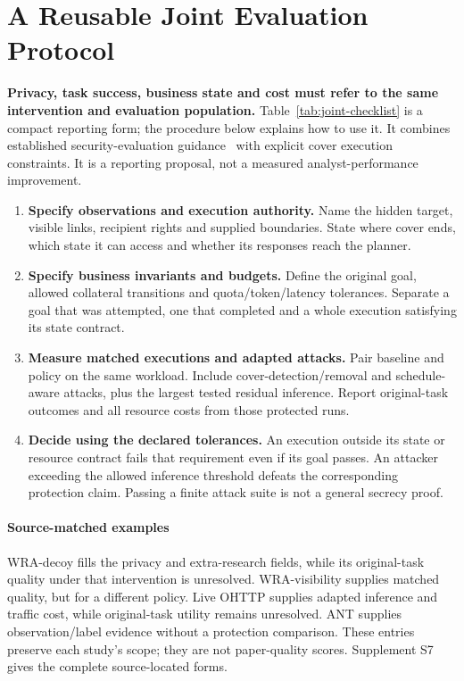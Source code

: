 \section{A Reusable Joint Evaluation Protocol}\label{sec:reporting}
\textbf{Privacy, task success, business state and cost must refer to the same intervention and evaluation population.}
Table~\ref{tab:joint-checklist} is a compact reporting form; the procedure below explains how to use it. It combines established security-evaluation guidance~\cite{arp2022dos,juarez2014critical,mathews2023critical,tramer2020adaptive} with explicit cover execution constraints. It is a reporting proposal, not a measured analyst-performance improvement.




\begin{enumerate}
\item \textbf{Specify observations and execution authority.} Name the hidden target, visible links, recipient rights and supplied boundaries. State where cover ends, which state it can access and whether its responses reach the planner.
\item \textbf{Specify business invariants and budgets.} Define the original goal, allowed collateral transitions and quota/token/latency tolerances. Separate a goal that was attempted, one that completed and a whole execution satisfying its state contract.
\item \textbf{Measure matched executions and adapted attacks.} Pair baseline and policy on the same workload. Include cover-detection/removal and schedule-aware attacks, plus the largest tested residual inference. Report original-task outcomes and all resource costs from those protected runs.
\item \textbf{Decide using the declared tolerances.} An execution outside its state or resource contract fails that requirement even if its goal passes. An attacker exceeding the allowed inference threshold defeats the corresponding protection claim. Passing a finite attack suite is not a general secrecy proof.
\end{enumerate}

\paragraph{Source-matched examples}
WRA-decoy fills the privacy and extra-research fields, while its original-task quality under that intervention is unresolved. WRA-visibility supplies matched quality, but for a different policy. Live OHTTP supplies adapted inference and traffic cost, while original-task utility remains unresolved. ANT supplies observation/label evidence without a protection comparison. These entries preserve each study's scope; they are not paper-quality scores. Supplement S7 gives the complete source-located forms.
